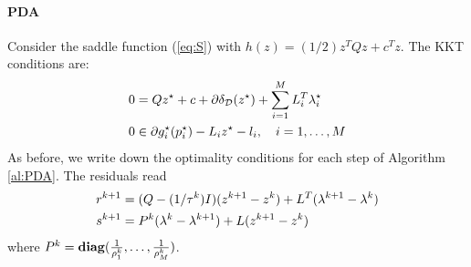 \documentclass[openany]{now}
\newcommand{\diag}{\mathop{\bf diag}}
\begin{document}
\paragraph{PDA} Consider the saddle function (\ref{eq:S}) with $h(z)=(1/2)z^TQz+c^Tz$. The KKT conditions are:
\begin{align}
 0 &= Qz^\star + c + \partial \delta_\mathcal{D}(z^\star) + \sum_{i=1}^M L_i^T\lambda_i^\star {\label{App:Opt_Cond_Pr}}\\
 0 &\in \partial g_i^{\star}(p_i^\star) - L_iz^{\star} - l_i, \quad i=1,\ldots,M {\label{App:Opt_Cond_Du}}
\end{align}
As before, we write down the optimality conditions for each step of Algorithm \ref{al:PDA}. The residuals read
\begin{align}{\label{app:res:pda}}
 r^{k+1} &= (Q-(1/\tau^k)I)(z^{k+1}-z^k) + L^T(\lambda^{k+1}-\lambda^k)\\
 s^{k+1} &= P^{k}(\lambda^k-\lambda^{k+1}) + L(z^{k+1}-z^k)
\end{align}
where $P^{k}=\diag(\frac{1}{\rho^k_1},\ldots,\frac{1}{\rho^k_M})$.

\end{document}

